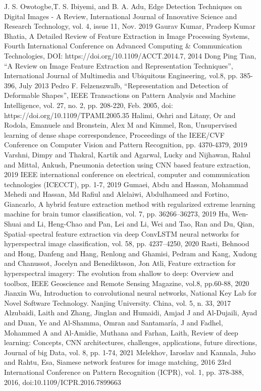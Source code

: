 \documentclass[conference]{IEEEtran}
\begin{document}
\begin{thebibliography}{00}

 J. S. Owotogbe,T. S. Ibiyemi, and B. A. Adu, Edge Detection Techniques on Digital Images - A Review, International Journal of Innovative Science and Research Technology, vol. 4, issue 11, Nov. 2019
 Gaurav Kumar, Pradeep Kumar Bhatia, A Detailed Review of Feature Extraction in Image Processing Systems, Fourth International Conference on Advanced Computing \& Communication Technologies, DOI: https://doi.org/10.1109/ACCT.2014.7, 2014
 Dong Ping Tian, ``A Review on Image Feature Extraction and Representation Techniques'', International Journal of Multimedia and Ubiquitous Engineering, vol.8, pp. 385-396, July 2013
 Pedro F. Felzenszwalb, ``Representation and Detection of Deformable Shapes'', IEEE Transactions on Pattern Analysis and Machine Intelligence, vol. 27, no. 2, pp. 208-220, Feb. 2005, doi: https://doi.org/10.1109/TPAMI.2005.35
 Halimi, Oshri and Litany, Or and Rodola, Emanuele and Bronstein, Alex M and Kimmel, Ron, Unsupervised learning of dense shape correspondence, Proceedings of the IEEE/CVF Conference on Computer Vision and Pattern Recognition, pp. 4370-4379, 2019
 Varshni, Dimpy and Thakral, Kartik and Agarwal, Lucky and Nijhawan, Rahul and Mittal, Ankush, Pneumonia detection using CNN based feature extraction, 2019 IEEE international conference on electrical, computer and communication technologies (ICECCT), pp. 1-7, 2019
 Gumaei, Abdu and Hassan, Mohammad Mehedi and Hassan, Md Rafiul and Alelaiwi, Abdulhameed and Fortino, Giancarlo, A hybrid feature extraction method with regularized extreme learning machine for brain tumor classification, vol. 7, pp. 36266--36273, 2019
 Hu, Wen-Shuai and Li, Heng-Chao and Pan, Lei and Li, Wei and Tao, Ran and Du, Qian, Spatial--spectral feature extraction via deep ConvLSTM neural networks for hyperspectral image classification, vol. 58, pp. 4237--4250, 2020
 Rasti, Behnood and Hong, Danfeng and Hang, Renlong and Ghamisi, Pedram and Kang, Xudong and Chanussot, Jocelyn and Benediktsson, Jon Atli, Feature extraction for hyperspectral imagery: The evolution from shallow to deep: Overview and toolbox, IEEE Geoscience and Remote Sensing Magazine, vol.8, pp.60-88, 2020
 Jianxin Wu, Introduction to convolutional neural networks, National Key Lab for Novel Software Technology. Nanjing University. China, vol. 5, n. 33, 2017
 Alzubaidi, Laith and Zhang, Jinglan and Humaidi, Amjad J and Al-Dujaili, Ayad and Duan, Ye and Al-Shamma, Omran and Santamaría, J and Fadhel, Mohammed A and Al-Amidie, Muthana and Farhan, Laith, Review of deep learning: Concepts, CNN architectures, challenges, applications, future directions, Journal of big Data, vol. 8, pp. 1-74, 2021
 Melekhov, Iaroslav and Kannala, Juho and Rahtu, Esa, Siamese network features for image matching, 2016 23rd International Conference on Pattern Recognition (ICPR), vol. 1, pp. 378-388, 2016, doi:10.1109/ICPR.2016.7899663

\end{thebibliography}
\end{document}
